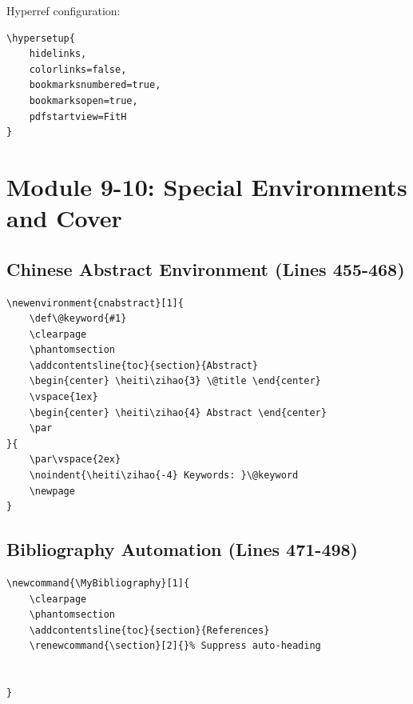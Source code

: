 \documentclass[linux]{hustreport}
\begin{document}
Hyperref configuration:

\begin{verbatim}
\hypersetup{
    hidelinks,
    colorlinks=false,
    bookmarksnumbered=true,
    bookmarksopen=true,
    pdfstartview=FitH
}
\end{verbatim}

\newpage
\section{Module 9-10: Special Environments and Cover}

\subsection{Chinese Abstract Environment (Lines 455-468)}

\begin{verbatim}
\newenvironment{cnabstract}[1]{
    \def\@keyword{#1}
    \clearpage
    \phantomsection
    \addcontentsline{toc}{section}{Abstract}
    \begin{center} \heiti\zihao{3} \@title \end{center}
    \vspace{1ex}
    \begin{center} \heiti\zihao{4} Abstract \end{center}
    \par
}{
    \par\vspace{2ex}
    \noindent{\heiti\zihao{-4} Keywords: }\@keyword
    \newpage
}
\end{verbatim}

\subsection{Bibliography Automation (Lines 471-498)}

\begin{verbatim}
\newcommand{\MyBibliography}[1]{
    \clearpage
    \phantomsection
    \addcontentsline{toc}{section}{References}
    \renewcommand{\section}[2]{}% Suppress auto-heading
    
    
}
\end{verbatim}
\end{document}
